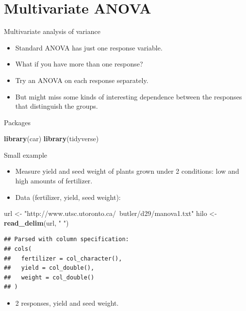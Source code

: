 \documentclass[
  ignorenonframetext,
]{beamer}
\newenvironment{Shaded}{\begin{snugshade}}{\end{snugshade}}
\newcommand{\KeywordTok}[1]{\textcolor[rgb]{0.13,0.29,0.53}{\textbf{#1}}}
\newcommand{\NormalTok}[1]{#1}
\newcommand{\StringTok}[1]{\textcolor[rgb]{0.31,0.60,0.02}{#1}}
\providecommand{\tightlist}{%
  \setlength{\itemsep}{0pt}\setlength{\parskip}{0pt}}
\begin{document}
\hypertarget{multivariate-anova}{%
\section{Multivariate ANOVA}\label{multivariate-anova}}

\begin{frame}{Multivariate analysis of variance}
\protect\hypertarget{multivariate-analysis-of-variance}{}

\begin{itemize}
\item
  Standard ANOVA has just one response variable.
\item
  What if you have more than one response?
\item
  Try an ANOVA on each response separately.
\item
  But might miss some kinds of interesting dependence between the
  responses that distinguish the groups.
\end{itemize}

\end{frame}

\begin{frame}[fragile]{Packages}
\protect\hypertarget{packages-4}{}

\begin{Shaded}
\begin{Highlighting}[]
\KeywordTok{library}\NormalTok{(car)}
\KeywordTok{library}\NormalTok{(tidyverse)}
\end{Highlighting}
\end{Shaded}

\end{frame}

\begin{frame}[fragile]{Small example}
\protect\hypertarget{small-example}{}

\begin{itemize}
\item
  Measure yield and seed weight of plants grown under 2 conditions: low
  and high amounts of fertilizer.
\item
  Data (fertilizer, yield, seed weight):
\end{itemize}

\begin{Shaded}
\begin{Highlighting}[]
\NormalTok{url <-}\StringTok{ "http://www.utsc.utoronto.ca/~butler/d29/manova1.txt"}
\NormalTok{hilo <-}\StringTok{ }\KeywordTok{read_delim}\NormalTok{(url, }\StringTok{" "}\NormalTok{)}
\end{Highlighting}
\end{Shaded}

\begin{verbatim}
## Parsed with column specification:
## cols(
##   fertilizer = col_character(),
##   yield = col_double(),
##   weight = col_double()
## )
\end{verbatim}

\begin{itemize}
\tightlist
\item
  2 responses, yield and seed weight.
\end{itemize}

\end{frame}
\end{document}

